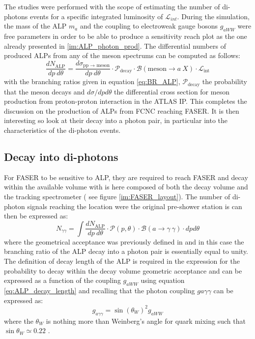 		The studies were performed with the scope of estimating the number of di-photons events for a specific integrated luminosity of $\mathcal{L}_{int}$. During the simulation, the mass of the ALP $m_a$ and the coupling to electroweak gauge bosons $g_{aWW}$ were free parameters in order to be able to produce a sensitivity reach plot as the one already presented in \ref{im:ALP_photon_prod}. The differential numbers of produced ALPs from any of the meson spectrums can be computed as follows: 
		\begin{equation}
			\frac{dN_{\text{ALP}}}{dp~d\theta} =  \frac{d\sigma_{\text{pp $\rightarrow$ meson}}}{dp~d\theta} \cdot \mathcal{P}_{\text{decay}} \cdot \mathcal{B}(\text{meson} \rightarrow a~X) \cdot \mathcal{L}_{\text{int}}
		\end{equation}
		with the branching ratios given in equation \ref{eq:BR_ALP}, $\mathcal{P}_{\text{decay}}$ the probability that the meson decays and $d\sigma/dpd\theta$ the differential cross section for meson production from proton-proton interaction in the ATLAS IP. This completes the discussion on the production of ALPs from FCNC reaching FASER. It is then interesting so look at their decay into a photon pair, in particular into the characteristics of the di-photon events.  
		
		\subsection{Decay into di-photons}
		For FASER to be sensitive to ALP, they are required to reach FASER and decay within the available volume with is here composed of both the decay volume and the tracking spectrometer ( see figure \ref{im:FASER_layout}). The number of di-photon signals reaching the location were the original pre-shower station is can then be expressed as: 
		\begin{equation}
			N_{\gamma\gamma} = \int \frac{dN_{\text{ALP}}}{dp~d\theta} \cdot \mathcal{P}(p, \theta) \cdot \mathcal{B}(a \rightarrow \gamma~\gamma) \cdot dpd\theta
		\end{equation}
		where the geometrical acceptance was previously defined in  and in this case the branching ratio of the ALP decay into a photon pair is essentially equal to unity. The definition of decay length of the ALP is required in the expression for the probability to decay within the decay volume geometric acceptance and can be expressed as a function of the coupling $g_{aWW}$ using equation \ref{eq:ALP_decay_length} and recalling that the photon coupling $g{a\gamma\gamma}$ can be expressed as: 
		\begin{equation}
			g_{a\gamma\gamma} = \sin(\theta_W)^2 g_{aWW} 
		\end{equation}  
		where the $\theta_W$ is nothing more than Weinberg's angle for quark mixing such that $\sin{\theta_W} \simeq 0.22$ \cite{Weinberg}. 
		
